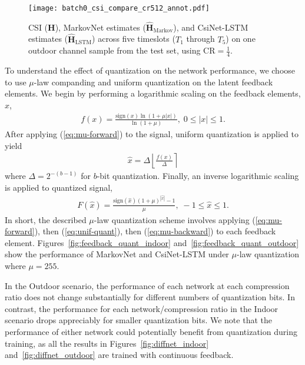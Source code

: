 \begin{figure}[htb] \centering 
	\texttt{[image: batch0\_csi\_compare\_cr512\_annot.pdf]}
	\caption{CSI ($\mathbf H$), MarkovNet estimates ($\hat{\mathbf H}_{\text{Markov}}$), and CsiNet-LSTM estimates ($\hat{\mathbf H}_{\text{LSTM}}$) across five timeslots ($T_1$ through $T_5$) on one outdoor channel sample from the test set,
using $\text{CR}=\frac 14$.} 
	\label{fig:csi_image} 
\end{figure}

To understand the effect of quantization on the network performance, we choose to use $\mu$-law companding and uniform quantization on the latent feedback elements. We begin by performing a logarithmic scaling on the feedback elements, $x$,
\begin{align}
	f(x) = \frac{\text{sign}(x)\ln\left(1 + \mu|x|\right)}{\ln\left(1 + \mu\right)} , \; 0 \leq |x| \leq 1. \label{eq:mu-forward}
\end{align}
After applying (\ref{eq:mu-forward}) to the signal, uniform quantization is applied to yield
\begin{align}
	\hat x = \Delta\left\lfloor\frac{f(x)}{\Delta}\right\rceil \label{eq:unif-quant}
\end{align}
where $\Delta = 2^{-(b-1)}$ for $b$-bit quantization. Finally, an inverse logarithmic scaling is applied to quantized signal,
\begin{align}
	F(\hat x) = \frac{\text{sign}(\hat x)\left(1 + \mu\right)^{|\hat x|} - 1}{\mu} , \; -1 \leq \hat x \leq 1. \label{eq:mu-backward}
\end{align}
In short, the described $\mu$-law quantization scheme involves applying (\ref{eq:mu-forward}), then (\ref{eq:unif-quant}), then (\ref{eq:mu-backward}) to each feedback element. Figures~\ref{fig:feedback_quant_indoor} and~\ref{fig:feedback_quant_outdoor} show the performance of MarkovNet and CsiNet-LSTM under $\mu$-law quantization where $\mu=255$.

In the Outdoor scenario, the performance of each network at each compression ratio does not change substantially for different numbers of quantization bits. In contrast, the performance for each network/compression ratio in the Indoor scenario drops appreciably for smaller quantization bits. We note that the performance of either network could potentially benefit from quantization during training, as all the results in Figures~\ref{fig:diffnet_indoor} and~\ref{fig:diffnet_outdoor} are trained with continuous feedback.

